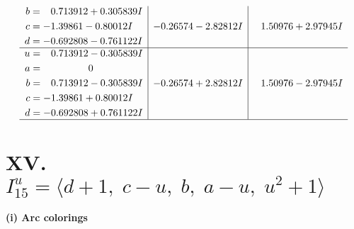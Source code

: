 \documentclass[1p]{elsarticle_modified}
\theoremstyle{definition}
\begin{document}
$$\begin{array}{c|c|c}
\begin{aligned}
b &= \phantom{-}0.713912 + 0.305839 I \\
c &= -1.39861 - 0.80012 I \\
d &= -0.692808 - 0.761122 I\end{aligned}
 & -0.26574 - 2.82812 I & \phantom{-}1.50976 + 2.97945 I \\ \hline\begin{aligned}
u &= \phantom{-}0.713912 - 0.305839 I \\
a &= \phantom{-0.000000 } 0 \\
b &= \phantom{-}0.713912 - 0.305839 I \\
c &= -1.39861 + 0.80012 I \\
d &= -0.692808 + 0.761122 I\end{aligned}
 & -0.26574 + 2.82812 I & \phantom{-}1.50976 - 2.97945 I\\
 \hline 
 \end{array}$$\newpage\newpage\renewcommand{\arraystretch}{1}
\centering \section*{XV. $I^u_{15}= \langle d+1,\;c- u,\;b,\;a- u,\;u^2+1 \rangle$}
\flushleft \textbf{(i) Arc colorings}\\
\end{document}
